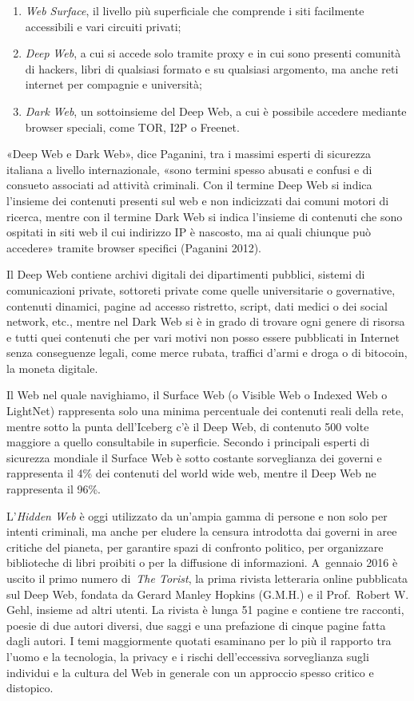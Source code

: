 \documentclass[
  b5paper,
  twoside,
  11pt,
  chapterprefix=false,
  bibliography=totocnumbered,
  parskip=0]{scrbook}
\begin{document}
\begin{enumerate}
\def\labelenumi{\arabic{enumi}.}
\item
  \emph{Web Surface}, il livello più superficiale che comprende i siti
  facilmente accessibili e vari circuiti privati;
\item
  \emph{Deep} \emph{Web}, a cui si accede solo tramite proxy e in cui sono
  presenti comunità di hackers, libri di qualsiasi formato e su
  qualsiasi argomento, ma anche reti internet per compagnie e
  università;
\item
  \emph{Dark} \emph{Web}, un sottoinsieme del Deep Web, a cui è possibile
  accedere mediante browser speciali, come TOR, I2P o Freenet.
\end{enumerate}

«Deep Web e Dark Web», dice Paganini, tra i massimi esperti di sicurezza
italiana a livello internazionale, «sono termini spesso abusati e
confusi e di consueto associati ad attività criminali. Con il termine
Deep Web si indica l'insieme dei contenuti presenti sul web e non
indicizzati dai comuni motori di ricerca, mentre con il termine Dark Web
si indica l'insieme di contenuti che sono ospitati in siti web il cui
indirizzo IP è nascosto, ma ai quali chiunque può accedere» tramite
browser specifici (Paganini 2012).

Il Deep Web contiene archivi digitali dei dipartimenti pubblici, sistemi
di comunicazioni private, sottoreti private come quelle universitarie o
governative, contenuti dinamici, pagine ad accesso ristretto, script,
dati medici o dei social network, etc., mentre nel Dark Web si è in
grado di trovare ogni genere di risorsa e tutti quei contenuti che per
vari motivi non posso essere pubblicati in Internet senza conseguenze
legali, come merce rubata, traffici d'armi e droga o di bitocoin, la
moneta digitale.

Il Web nel quale navighiamo, il Surface Web (o Visible Web o Indexed Web
o LightNet) rappresenta solo una minima percentuale dei contenuti reali
della rete, mentre sotto la punta dell'Iceberg c'è il Deep Web, di
contenuto 500 volte maggiore a quello consultabile in superficie.
Secondo i principali esperti di sicurezza mondiale il Surface Web è
sotto costante sorveglianza dei governi e rappresenta il 4\% dei
contenuti del world wide web, mentre il Deep Web ne rappresenta il 96\%.

L'\emph{Hidden Web} è oggi utilizzato da un'ampia gamma di persone e non solo
per intenti criminali, ma anche per eludere la censura introdotta dai
governi in aree critiche del pianeta, per garantire spazi di confronto
politico, per organizzare biblioteche di libri proibiti o per la
diffusione di informazioni. A~gennaio 2016 è uscito il primo numero
di~\emph{The Torist}, la prima rivista letteraria online pubblicata sul Deep
Web, fondata da Gerard Manley Hopkins (G.M.H.) e il Prof.~Robert W.
Gehl, insieme ad altri utenti. La rivista è lunga 51 pagine e contiene
tre racconti, poesie di due autori diversi, due saggi e una prefazione
di cinque pagine fatta dagli autori. I temi maggiormente quotati
esaminano per lo più il rapporto tra l'uomo e la tecnologia, la privacy
e i rischi dell'eccessiva sorveglianza sugli individui e la cultura del
Web in generale con un approccio spesso critico e distopico.
\end{document}
